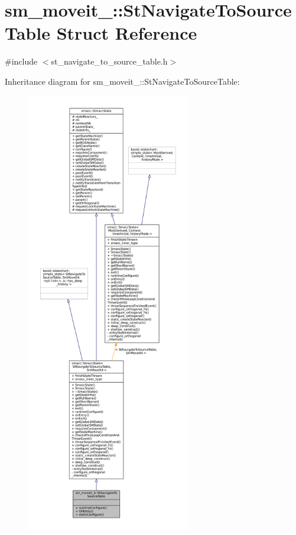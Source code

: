 \hypertarget{structsm__moveit__4_1_1StNavigateToSourceTable}{}\section{sm\+\_\+moveit\+\_\+:\+:St\+Navigate\+To\+Source\+Table Struct Reference}
\label{structsm__moveit__4_1_1StNavigateToSourceTable}


{\ttfamily \#include $<$st\+\_\+navigate\+\_\+to\+\_\+source\+\_\+table.\+h$>$}



Inheritance diagram for sm\+\_\+moveit\+\_\+:\+:St\+Navigate\+To\+Source\+Table\+:
\nopagebreak
\begin{figure}[H]
\begin{center}
\leavevmode
\includegraphics[height=550pt]{structsm__moveit__4_1_1StNavigateToSourceTable__inherit__graph}
\end{center}
\end{figure}



